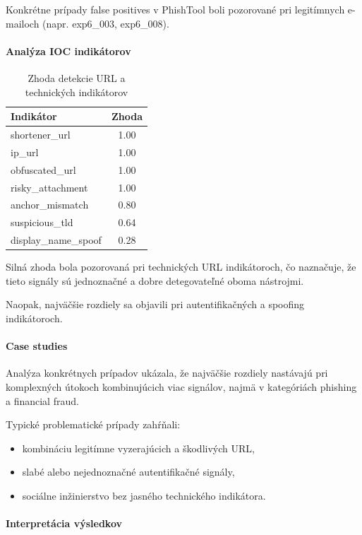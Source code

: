 \documentclass[conference]{IEEEtran}
\begin{document}
Konkrétne prípady false positives v PhishTool boli pozorované
pri legitímnych e-mailoch (napr. exp6\_003, exp6\_008).

\paragraph{Analýza IOC indikátorov}

\begin{table}[H]
\centering
\caption{Zhoda detekcie URL a technických indikátorov}
\begin{tabular}{lc}
\hline
Indikátor & Zhoda \\
\hline
shortener\_url & 1.00 \\
ip\_url & 1.00 \\
obfuscated\_url & 1.00 \\
risky\_attachment & 1.00 \\
anchor\_mismatch & 0.80 \\
suspicious\_tld & 0.64 \\
display\_name\_spoof & 0.28 \\
\hline
\end{tabular}
\end{table}

Silná zhoda bola pozorovaná pri technických URL indikátoroch,
čo naznačuje, že tieto signály sú jednoznačné a dobre detegovateľné
oboma nástrojmi.

Naopak, najväčšie rozdiely sa objavili pri autentifikačných a spoofing indikátoroch.

\paragraph{Case studies}

Analýza konkrétnych prípadov ukázala, že najväčšie rozdiely
nastávajú pri komplexných útokoch kombinujúcich viac signálov,
najmä v kategóriách phishing a financial fraud.

Typické problematické prípady zahŕňali:

\begin{itemize}
    \item kombináciu legitímne vyzerajúcich a škodlivých URL,
    \item slabé alebo nejednoznačné autentifikačné signály,
    \item sociálne inžinierstvo bez jasného technického indikátora.
\end{itemize}

\paragraph{Interpretácia výsledkov}
\end{document}
